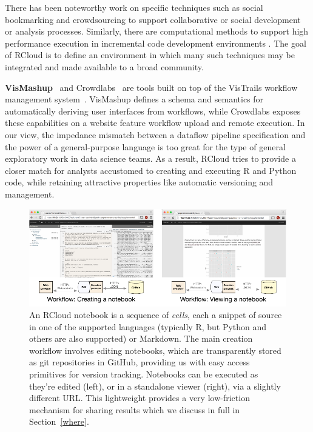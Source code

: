 There has been noteworthy work on specific techniques such as
social bookmarking \cite{Millen:2006:DSB} \cite{Heer:2007:VAV}
and crowdsourcing \cite{Fast:2014:ECS} to support collaborative
or social development or analysis processes.
Similarly, there are computational methods to support high
performance execution in incremental code development
environments \cite{Guo:2010:TPI}.
The goal of RCloud is to define an environment in which many such
techniques may be integrated and made available to a broad community.

{\bf VisMashup}~\cite{Santos:2009:VST} and Crowdlabs~\cite{Mates:2011:CSA}
are tools built on top of the VisTrails workflow management
system~\cite{Callahan:2006:VVM}. VisMashup defines a schema and
semantics for automatically deriving user interfaces from workflows,
while Crowdlabs exposes these capabilities on a website feature
workflow upload and remote execution. In our view, the impedance
mismatch between a dataflow pipeline specification and the power of a
general-purpose language is too great for the type of general
exploratory work in data science teams. As a result, RCloud tries to
provide a closer match for analysts accustomed to creating and
executing R and Python code, while retaining attractive
properties like automatic versioning and management.

\begin{figure}
\centering
\includegraphics[width=.95\linewidth]{fig/notebook/notebook.pdf}
\caption{\label{fig:notebook}An RCloud notebook is a sequence of
  \emph{cells}, each a snippet of source in one of the supported languages (typically R, but Python and others are also supported) or Markdown. The main creation workflow involves editing notebooks, which are transparently stored as git repositories in GitHub, providing us with easy access primitives for version tracking. Notebooks can be executed as they're edited (left), or in a standalone viewer (right), via a slightly different URL. This lightweight provides a very low-friction mechanism for sharing results which we discuss in full in Section~\ref{where}. }
\end{figure}

